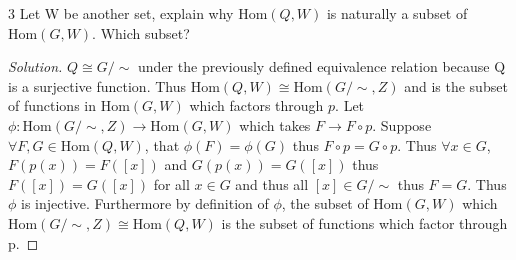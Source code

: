 \documentclass{article}
\newcommand{\Hom}[0]{\text{Hom}}
\newenvironment{solution}
{\renewcommand\qedsymbol{$\blacksquare$}\begin{proof}[Solution]}
{\end{proof}}
\begin{document}
\bigskip

\begin{PROB}{3}\label{Problem 3.}
    Let W be another set, explain why $\Hom(Q,W)$ is naturally a subset of $\Hom(G,W)$. Which subset? 
\end{PROB}
\begin{solution}
    $Q \cong G/\sim$ under the previously defined equivalence relation because Q is a surjective function. Thus $\Hom(Q, W) \cong \Hom(G/\sim, Z)$ and is the subset of functions in $\Hom(G,W)$ which factors through $p$. Let $\phi: \Hom(G/\sim, Z) \to \Hom(G,W)$ which takes $F \to F \circ p$. Suppose $\forall F, G \in \Hom(Q, W)$, that $\phi(F) = \phi(G)$ thus $F \circ p = G \circ p$. Thus $\forall x \in G$, $F(p(x)) = F([x])$ and $G(p(x)) = G([x])$ thus $F([x]) = G([x])$ for all $x \in G$ and thus all $[x] \in G/\sim$ thus $F = G$. Thus $\phi$ is injective. Furthermore by definition of $\phi$, the subset of $\Hom(G,W)$ which $\Hom(G/\sim, Z) \cong \Hom(Q,W)$ is the subset of functions which factor through p.
\end{solution}

\bigskip
\end{document}
